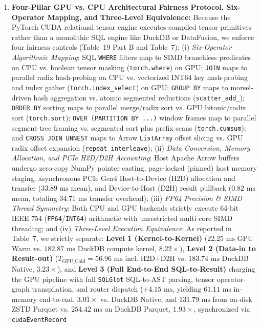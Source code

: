 \documentclass[10pt,a4paper]{article}
\begin{document}
\begin{enumerate}[leftmargin=1.5em,itemsep=2pt]
$\text{CSCI}(q)$ correlates significantly with multi-engine query execution complexity---including distributed cloud slot compute time on BigQuery ($\rho = 0.5124, p = 2.41\times 10^{-6}$), Apache DataFusion CPU latency ($\rho = 0.3839, p = 0.0007$), and Polars latency ($\rho = 0.3137, p = 0.0061$)---and on the external 22-query TPC-H suite (Q1--Q22) exhibits strong alignment with AST node complexity ($\rho = 0.8418, p = 9.12\times 10^{-7}$) and a partial correlation of $\rho_{\text{partial}} = 0.5840$ ($p = 0.0054$) with join/subquery execution work controlling for scanned table volume.
    \item \textbf{Four-Pillar GPU vs. CPU Architectural Fairness Protocol, Six-Operator Mapping, and Three-Level Equivalence:} Because the PyTorch CUDA relational tensor engine executes compiled tensor primitives rather than a monolithic SQL engine like DuckDB or DataFusion, we enforce four fairness controls (Table~19 Part B and Table~7): (i) \emph{Six-Operator Algorithmic Mapping}: SQL \texttt{WHERE} filters map to SIMD branchless predicates on CPU vs. boolean tensor masking (\texttt{torch.where}) on GPU; \texttt{JOIN} maps to parallel radix hash-probing on CPU vs. vectorized INT64 key hash-probing and index gather (\texttt{torch.index\_\allowbreak{}select}) on GPU; \texttt{GROUP BY} maps to morsel-driven hash aggregation vs. atomic segmented reductions (\texttt{scatter\_\allowbreak{}add\_\allowbreak{}}); \texttt{ORDER BY} sorting maps to parallel merge/radix sort vs. GPU bitonic/radix sort (\texttt{torch.sort}); \texttt{OVER (PARTITION BY ...)} window frames map to parallel segment-tree framing vs. segmented sort plus prefix scans (\texttt{torch.cumsum}); and \texttt{CROSS JOIN UNNEST} maps to Arrow \texttt{ListArray} offset slicing vs. GPU radix offset expansion (\texttt{repeat\_\allowbreak{}interleave}); (ii) \emph{Data Conversion, Memory Allocation, and PCIe H2D/D2H Accounting}: Host Apache Arrow buffers undergo zero-copy NumPy pointer casting, page-locked (pinned) host memory staging, asynchronous PCIe Gen4 Host-to-Device (H2D) allocation and transfer ($33.89\text{ ms}$ mean), and Device-to-Host (D2H) result pullback ($0.82\text{ ms}$ mean, totaling $34.71\text{ ms}$ transfer overhead); (iii) \emph{FP64 Precision \& SIMD Thread Symmetry}: Both CPU and GPU backends strictly execute 64-bit IEEE 754 (\texttt{FP64}/\texttt{INT64}) arithmetic with unrestricted multi-core SIMD threading; and (iv) \emph{Three-Level Execution Equivalence}: As reported in Table~7, we strictly separate: \textbf{Level 1 (Kernel-to-Kernel)} ($22.25\text{ ms}$ GPU Warm vs. $182.87\text{ ms}$ DuckDB compute kernel, $8.22\times$), \textbf{Level 2 (Data-in to Result-out)} ($T_{\text{GPU\_Cold}} = 56.96\text{ ms}$ incl. H2D+D2H vs. $183.74\text{ ms}$ DuckDB Native, $3.23\times$), and \textbf{Level 3 (Full End-to-End SQL-to-Result)} charging the GPU pipeline with full \texttt{SQLGlot} SQL-to-AST parsing, tensor operator-graph transpilation, and router dispatch ($+4.15\text{ ms}$, yielding $61.11\text{ ms}$ in-memory end-to-end, $3.01\times$ vs. DuckDB Native, and $131.79\text{ ms}$ from on-disk ZSTD Parquet vs. $254.42\text{ ms}$ on DuckDB Parquet, $1.93\times$, synchronized via \texttt{cudaEventRecord} 
\end{enumerate}
\end{document}
